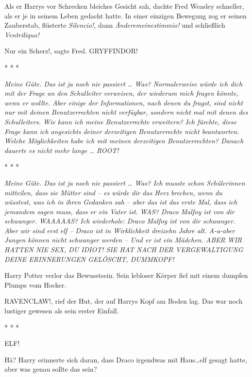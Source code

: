 Als er Harrys vor Schrecken bleiches Gesicht sah, dachte Fred Weasley schneller,
als er je in seinem Leben gedacht hatte. In einer einzigen Bewegung zog er
seinen Zauberstab, flüsterte \emph{\glqq{}Silencio!\grqq{}}, dann \emph{\glqq{}
Änderemeinestimmio!\grqq{}} und schließlich \emph{\glqq{}Ventriliquo!\grqq{}}

\glqq{}Nur ein Scherz!\grqq{}, sagte Fred. \glqq{}GRYFFINDOR!\grqq{}

* * *

\emph{\glqq{}Meine Güte. Das ist ja noch nie passiert …\grqq{}
Was? \glqq{}Normalerweise würde ich dich mit der Frage an den Schulleiter
verweisen, der wiederum mich fragen könnte, wenn er wollte. Aber einige der
Informationen, nach denen du fragst, sind nicht nur mit deinen Benutzerrechten
nicht verfügbar, sondern nicht mal mit denen des Schulleiters.\grqq{} Wie kann
ich meine Benutzerrechte erweitern? \glqq{}Ich fürchte, diese Frage kann ich
angesichts deiner derzeitigen Benutzerrechte nicht beantworten.\grqq{} Welche
Möglichkeiten habe \emph{ich mit meinen derzeitigen Benutzerrechten?} Danach
dauerte es nicht mehr lange … \glqq{}ROOT!\grqq{}}

* * *

\emph{\glqq{}Meine Güte. Das ist ja noch nie passiert …\grqq{}
Was? \glqq{}Ich musste schon Schülerinnen mitteilen, dass sie Mütter sind – es
würde dir das Herz brechen, wenn du wüsstest, was ich in ihren Gedanken sah –
aber das ist das erste Mal, dass ich jemandem sagen muss, dass er ein Vater
ist.\grqq{} WAS? \glqq{}Draco Malfoy ist von dir schwanger.\grqq{} WAAAAAS? \glqq{}
Ich wiederhole: Draco Malfoy ist von dir schwanger.\grqq{} Aber wir sind erst
elf – \glqq{}Draco ist in Wirklichkeit dreizehn Jahre alt.\grqq{} A-a-aber Jungen
können nicht schwanger werden – \glqq{}Und er ist ein Mädchen.\grqq{} ABER WIR
HATTEN NIE SEX, DU IDIOT! \glqq{}SIE HAT NACH DER VERGEWALTIGUNG DEINE
ERINNERUNGEN GELÖSCHT, DUMMKOPF!\grqq{}}

Harry Potter verlor das Bewusstsein. Sein lebloser Körper fiel mit einem dumpfen
Plumps vom Hocker.

\glqq{}RAVENCLAW!\grqq{}, rief der Hut, der auf Harrys Kopf am Boden lag. Das war
noch lustiger gewesen als sein erster Einfall.

* * *

\glqq{}ELF!\grqq{}

Hä? Harry erinnerte sich daran, dass Draco irgendwas mit \glqq{}Haus…elf\grqq{}
gesagt hatte, aber was genau sollte das sein?

